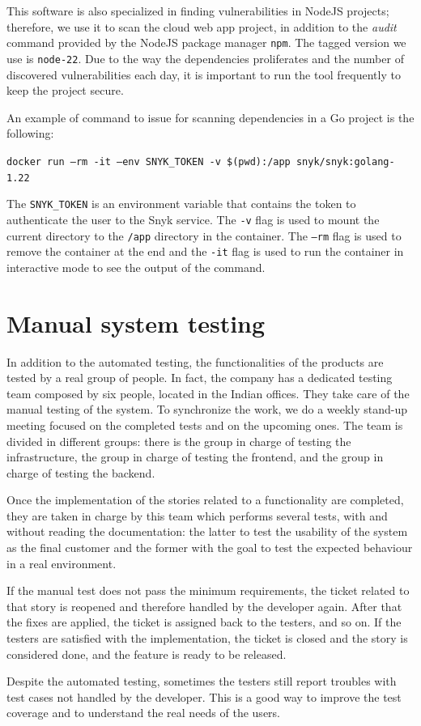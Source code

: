 This software is also specialized in finding vulnerabilities in NodeJS projects; therefore, we use it to scan the cloud web app project, in addition to the \textit{audit} command provided by the NodeJS package manager \texttt{npm}. The tagged version we use is \texttt{node-22}. Due to the way the dependencies proliferates and the number of discovered vulnerabilities each day, it is important to run the tool frequently to keep the project secure.

An example of command to issue for scanning dependencies in a Go project is the following:
\begin{mdframed}
  \texttt{docker run --rm -it --env SNYK\_TOKEN -v \$(pwd):/app snyk/snyk:golang-1.22}
\end{mdframed}
The \texttt{SNYK\_TOKEN} is an environment variable that contains the token to authenticate the user to the Snyk service. The \texttt{-v} flag is used to mount the current directory to the \texttt{/app} directory in the container. The \texttt{--rm} flag is used to remove the container at the end and the \texttt{-it} flag is used to run the container in interactive mode to see the output of the command.

\section{Manual system testing}

In addition to the automated testing, the functionalities of the products are tested by a real group of people. In fact, the company has a dedicated testing team composed by six people, located in the Indian offices. They take care of the manual testing of the system. To synchronize the work, we do a weekly stand-up meeting focused on the completed tests and on the upcoming ones. The team is divided in different groups: there is the group in charge of testing the infrastructure, the group in charge of testing the frontend, and the group in charge of testing the backend.

Once the implementation of the stories related to a functionality are completed, they are taken in charge by this team which performs several tests, with and without reading the documentation: the latter to test the usability of the system as the final customer and the former with the goal to test the expected behaviour in a real environment.

If the manual test does not pass the minimum requirements, the ticket related to that story is reopened and therefore handled by the developer again. After that the fixes are applied, the ticket is assigned back to the testers, and so on. If the testers are satisfied with the implementation, the ticket is closed and the story is considered done, and the feature is ready to be released.

Despite the automated testing, sometimes the testers still report troubles with test cases not handled by the developer. This is a good way to improve the test coverage and to understand the real needs of the users.
